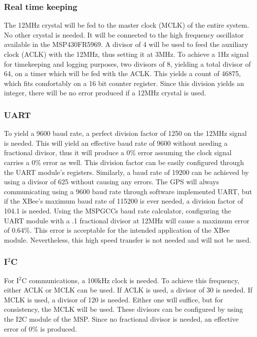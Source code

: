 \subsubsection{Real time keeping}
The 12MHz crystal will be fed to the master clock (MCLK) of the entire system. No other crystal is needed. It will be connected to the high frequency oscillator available in the MSP430FR5969. A divisor of 4 will be used to feed the auxiliary clock (ACLK) with the 12MHz, thus setting it at 3MHz. To achieve a 1Hz signal for timekeeping and logging purposes, two divisors of 8, yielding a total divisor of 64, on a timer which will be fed with the ACLK. This yields a count of 46875, which fits comfortably on a 16 bit counter register. Since this division yields an integer, there will be no error produced if a 12MHz crystal is used.

\subsubsection{UART}
To yield a 9600 baud rate, a perfect division factor of 1250 on the 12MHz signal is needed. This will yield an effective baud rate of 9600 without needing a fractional divisor, thus it will produce a 0\% error assuming the clock signal carries a 0\% error as well. This division factor can be easily configured through the UART module's registers. Similarly, a baud rate of 19200 can be achieved by using a divisor of 625 without causing any errors. The GPS will always communicating using a 9600 baud rate through software implemented UART, but if the XBee's maximum baud rate of 115200 is ever needed, a division factor of 104.1 is needed. Using the MSPGCCs baud rate calculator, configuring the UART module with a .1 fractional divisor at 12MHz will cause a maximum error of 0.64\%. This error is acceptable for the intended application of the XBee module. Nevertheless, this high speed transfer is not needed and will not be used.

\subsubsection{I$^2$C}
For I$^2$C communications, a 100kHz clock is needed. To achieve this frequency, either ACLK or MCLK can be used. If ACLK is used, a divisor of 30 is needed. If MCLK is used, a divisor of 120 is needed. Either one will suffice, but for consistency, the MCLK will be used. These divisors can be configured by using the I2C module of the MSP. Since no fractional divisor is needed, an effective error of 0\% is produced.

